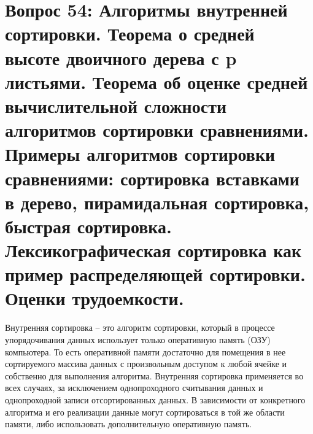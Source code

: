 
\section{Вопрос 54: Алгоритмы внутренней сортировки. Теорема о средней высоте двоичного дерева с p листьями. Теорема об оценке средней вычислительной сложности алгоритмов сортировки сравнениями. Примеры алгоритмов сортировки сравнениями: сортировка вставками в дерево, пирамидальная сортировка, быстрая сортировка. Лексикографическая сортировка как пример распределяющей сортировки. Оценки трудоемкости.}


Внутренняя сортировка – это алгоритм сортировки, который в процессе упорядочивания данных использует только оперативную память (ОЗУ) компьютера. То есть оперативной памяти достаточно для помещения в нее сортируемого массива данных с произвольным доступом к любой ячейке и собственно для выполнения алгоритма. Внутренняя сортировка применяется во всех случаях, за исключением однопроходного считывания данных и однопроходной записи отсортированных данных. В зависимости от конкретного алгоритма и его реализации данные могут сортироваться в той же области памяти, либо использовать дополнительную оперативную память.




\newpage
